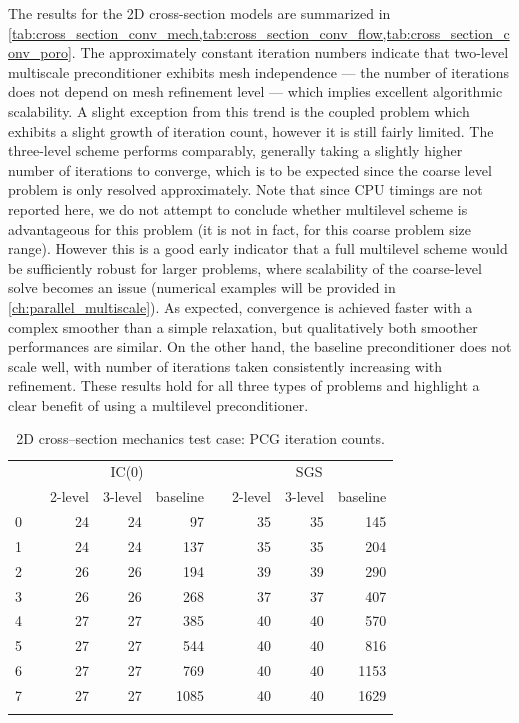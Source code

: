 The results for the 2D cross-section models are summarized in \cref{tab:cross_section_conv_mech,tab:cross_section_conv_flow,tab:cross_section_conv_poro}.   The approximately constant iteration numbers indicate that two-level multiscale preconditioner exhibits mesh independence --- the number of iterations does not depend on mesh refinement level --- which implies excellent algorithmic scalability.   A slight exception from this trend is the coupled problem which exhibits a slight growth of iteration count, however it is still fairly limited.   The three-level scheme performs comparably, generally taking a slightly higher number of iterations to converge, which is to be expected since the coarse level problem is only resolved approximately.   Note that since CPU timings are not reported here, we do not attempt to conclude whether multilevel scheme is advantageous for this problem (it is not in fact, for this coarse problem size range).    However this is a good early indicator that a full multilevel scheme would be sufficiently robust for larger problems, where scalability of the coarse-level solve becomes an issue (numerical examples will be provided in \cref{ch:parallel_multiscale}).   As expected, convergence is achieved faster with a complex smoother than a simple relaxation, but qualitatively both smoother performances are similar.   On the other hand, the baseline preconditioner does not scale well, with number of iterations taken consistently increasing with refinement.   These results hold for all three types of problems and highlight a clear benefit of using a multilevel preconditioner.

\begin{table}
    \centering
    \caption{2D cross--section mechanics test case: PCG iteration counts.}
    \label{tab:cross_section_conv_mech}
    \begin{tabular}{rrrrrrrrr}
        \hline\noalign{\smallskip}
        \multirow{2}{*}{$\ell$} & & \multicolumn{3}{c}{IC(0)} & & \multicolumn{3}{c}{SGS} \\
        \noalign{\smallskip}\cline{3-5} \cline{7-9}\noalign{\smallskip}
        & & 2-level & 3-level & baseline & & 2-level & 3-level & baseline \\
        \hline\noalign{\smallskip}
        0 & & 24 & 24 &   97 & & 35 & 35 &  145 \\
        1 & & 24 & 24 &  137 & & 35 & 35 &  204 \\
        2 & & 26 & 26 &  194 & & 39 & 39 &  290 \\
        3 & & 26 & 26 &  268 & & 37 & 37 &  407 \\
        4 & & 27 & 27 &  385 & & 40 & 40 &  570 \\
        5 & & 27 & 27 &  544 & & 40 & 40 &  816 \\
        6 & & 27 & 27 &  769 & & 40 & 40 & 1153 \\
        7 & & 27 & 27 & 1085 & & 40 & 40 & 1629 \\
        \hline\noalign{\smallskip}
    \end{tabular}
\end{table}

